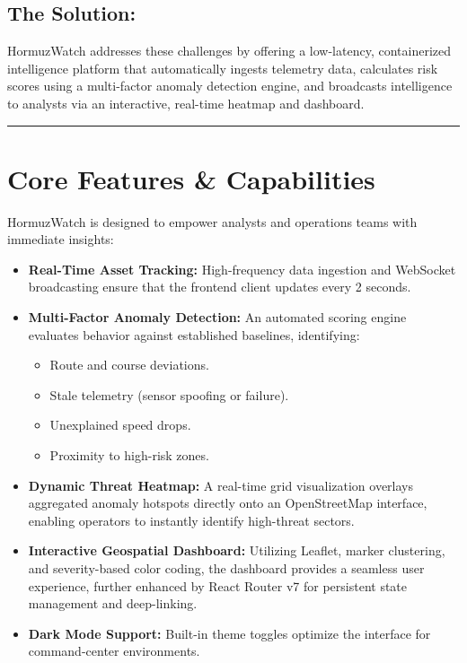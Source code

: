\documentclass[11pt,a4paper]{article}
\begin{document}
\subsection*{The Solution:}
HormuzWatch addresses these challenges by offering a low-latency, containerized intelligence platform that automatically ingests telemetry data, calculates risk scores using a multi-factor anomaly detection engine, and broadcasts intelligence to analysts via an interactive, real-time heatmap and dashboard.

\noindent\textcolor{textsecondary}{\rule{\textwidth}{0.5pt}}

\section{Core Features \& Capabilities}
HormuzWatch is designed to empower analysts and operations teams with immediate insights:

\begin{itemize}
    \item \textbf{Real-Time Asset Tracking:} High-frequency data ingestion and WebSocket broadcasting ensure that the frontend client updates every 2 seconds.
    \item \textbf{Multi-Factor Anomaly Detection:} An automated scoring engine evaluates behavior against established baselines, identifying:
    \begin{itemize}
        \item Route and course deviations.
        \item Stale telemetry (sensor spoofing or failure).
        \item Unexplained speed drops.
        \item Proximity to high-risk zones.
    \end{itemize}
    \item \textbf{Dynamic Threat Heatmap:} A real-time grid visualization overlays aggregated anomaly hotspots directly onto an OpenStreetMap interface, enabling operators to instantly identify high-threat sectors.
    \item \textbf{Interactive Geospatial Dashboard:} Utilizing Leaflet, marker clustering, and severity-based color coding, the dashboard provides a seamless user experience, further enhanced by React Router v7 for persistent state management and deep-linking.
    \item \textbf{Dark Mode Support:} Built-in theme toggles optimize the interface for command-center environments.
\end{itemize}
\end{document}
